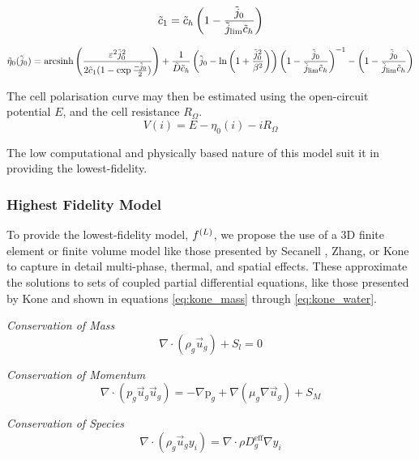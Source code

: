 \begin{equation}
	\tilde{c}_1 = \tilde{c}_h \left(1 - \frac{\tilde{j}_0}{\tilde{j}_{\text{lim}}\tilde{c}_h}\right)\label{eq:oxyconc}
\end{equation}

\begin{equation}
	\tilde{\eta}_0(\tilde{j}_0) = \text{arcsinh}\left(\frac{\varepsilon^2 \tilde{j}_0^2}{2 \tilde{c}_1 (1 - \exp{\frac{-\tilde{j}_0}{2}})}\right)
	+ \frac{1}{\tilde{D}\tilde{c}_h}\left(\tilde{j}_0 - \ln\left(1 + \frac{\tilde{j}_0^2}{\beta^2}\right)\right)\left(1 - \frac{\tilde{j}_0}{\tilde{j}_{\text{lim}}\tilde{c}_h}\right)^{-1}
	-\left(1 - \frac{\tilde{j}_0}{\tilde{j}_{\text{lim}}\tilde{c}_h}\right)
	\label{eq:kulfull}
\end{equation}

The cell polarisation curve may then be estimated using the open-circuit potential $E$, and the cell resistance \(R_{\Omega}\).
\begin{equation}
	V(i) = E - \eta_0(i) - iR_\Omega
\end{equation}

The low computational and physically based nature of this model suit it in providing the lowest-fidelity.

\subsubsection{Highest Fidelity Model}

To provide the lowest-fidelity model, $f^{(L)}$, we propose the use of a 3D finite element or finite volume model like those presented by Secanell \etal, Zhang, or Kone \etal \cite{secanellOpenFCSTOpenSourceMathematical2014, zhangOpenFuelCell2NewComputational2024, koneOpenSourceToolboxPEM2018} to capture in detail multi-phase, thermal, and spatial effects. These approximate the solutions to sets of coupled partial differential equations, like those presented by Kone \etal and shown in equations \ref{eq:kone_mass} through \ref{eq:kone_water}.

\textit{Conservation of Mass}
\begin{equation}
	\nabla \cdot (\rho_g \vec{u}_g) + S_l = 0 \label{eq:kone_mass}
\end{equation}

\textit{Conservation of Momentum}
\begin{equation}
	\nabla \cdot (p_g \vec{u}_g \vec{u}_g) = -\nabla \text{p}_g + \nabla (\mu_g \nabla \vec{u}_g) + S_M
\end{equation}

\textit{Conservation of Species}
\begin{equation}
	\nabla \cdot (\rho_g \vec{u}_g y_i) = \nabla \cdot \rho D^{\text{eff}}_g \nabla y_i
\end{equation}

